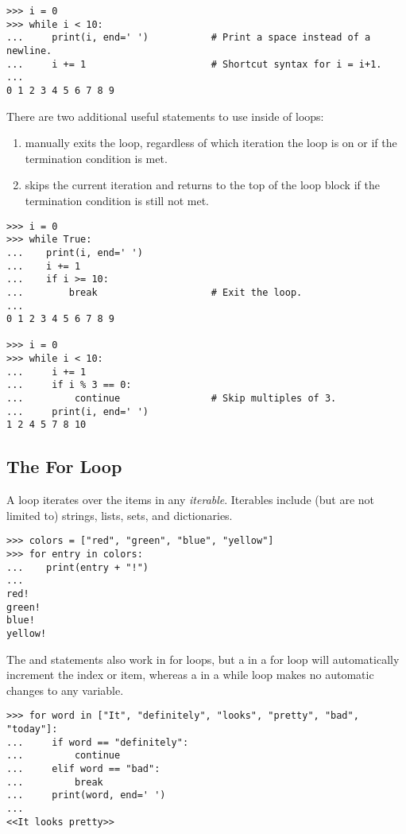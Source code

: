 \begin{lstlisting}
>>> i = 0
>>> while i < 10:
...     print(i, end=' ')           # Print a space instead of a newline.
...     i += 1                      # Shortcut syntax for i = i+1.
...
0 1 2 3 4 5 6 7 8 9
\end{lstlisting}

There are two additional useful statements to use inside of loops:
\begin{enumerate}
\item {} manually exits the loop, regardless of which iteration the loop is on or if the termination condition is met.
\item {} skips the current iteration and returns to the top of the loop block if the termination condition is still not met.
\end{enumerate}

\begin{lstlisting}
>>> i = 0
>>> while True:
...    print(i, end=' ')
...    i += 1
...    if i >= 10:
...        break                    # Exit the loop.
...
0 1 2 3 4 5 6 7 8 9

>>> i = 0
>>> while i < 10:
...     i += 1
...     if i % 3 == 0:
...         continue                # Skip multiples of 3.
...     print(i, end=' ')
1 2 4 5 7 8 10
\end{lstlisting}

\subsection*{The For Loop} %

A  loop iterates over the items in any \emph{iterable}.
Iterables include (but are not limited to) strings, lists, sets, and dictionaries.

\begin{lstlisting}
>>> colors = ["red", "green", "blue", "yellow"]
>>> for entry in colors:
...    print(entry + "!")
...
red!
green!
blue!
yellow!
\end{lstlisting}

The  and  statements also work in for loops, but a  in a for loop will automatically increment the index or item, whereas a  in a while loop makes no automatic changes to any variable.

\begin{lstlisting}
>>> for word in ["It", "definitely", "looks", "pretty", "bad", "today"]:
...     if word == "definitely":
...         continue
...     elif word == "bad":
...         break
...     print(word, end=' ')
...
<<It looks pretty>>
\end{lstlisting}


